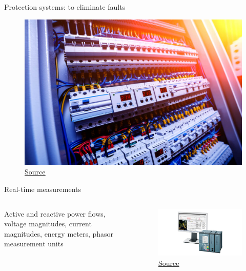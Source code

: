 \begin{frame}
{Protection systems: to eliminate faults}
\begin{figure}
\centering
\includegraphics[width=0.5\linewidth]{images/shutterstock_679069147-1.jpg}
\caption*{\href{https://www.exa-ecs.com/courant-fort-quels-sont-les-composants-dune-armoire-electrique/}{\underline{Source}}}
\end{figure}
\end{frame}

\begin{frame}{Real-time measurements}

\begin{columns}
    \begin{column}{0.5\textwidth}
    Active and reactive power flows, voltage magnitudes, current magnitudes, energy meters, phasor measurement units
    \end{column}
    \begin{column}{0.45\textwidth}
      \begin{figure}
      \centering
      \includegraphics[width=\linewidth]{images/phasor-measurement-unit.png}
      \caption*{\href{https://new.siemens.com/global/en/products/energy/energy-automation-and-smart-grid/protection-relays-and-control/general-protection/phasor-measurement-unit-pmu.html}{\underline{Source}}}
      \end{figure}
    \end{column}
\end{columns}

\end{frame}

